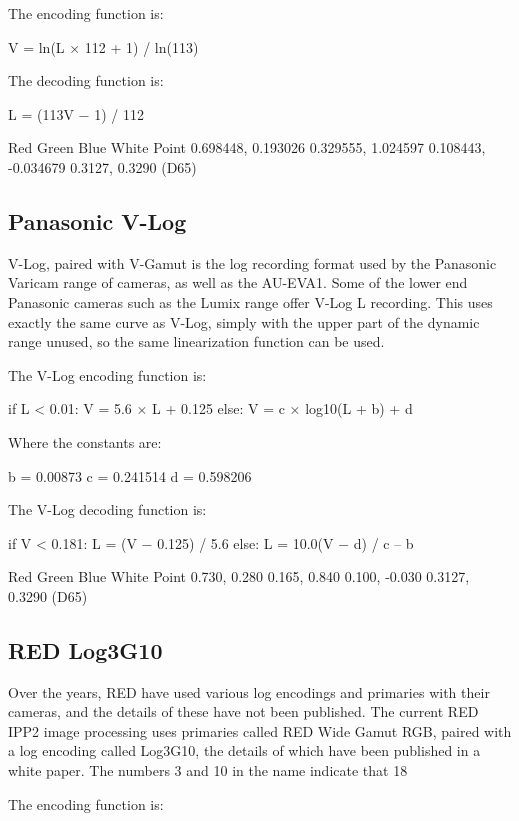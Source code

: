 The encoding function is:

	V = ln(L × 112 + 1) / ln(113)



The decoding function is:

	L = (113V − 1) / 112


Red
Green
Blue
White Point
0.698448, 0.193026
0.329555, 1.024597
0.108443, -0.034679
0.3127, 0.3290 (D65)

\subsection{Panasonic V-Log}%
\label{subsec:panasonic-v-log}

V-Log, paired with V-Gamut is the log recording format used by the Panasonic Varicam range of cameras, as well as the AU-EVA1. Some of the lower end Panasonic cameras such as the Lumix range offer V-Log L recording. This uses exactly the same curve as V-Log, simply with the upper part of the dynamic range unused, so the same linearization function can be used.

The V-Log encoding function is:

	if L < 0.01:
		V = 5.6 × L + 0.125
	else:
		V = c × log10(L + b) + d

Where the constants are:

	b = 0.00873
c = 0.241514
d = 0.598206



The V-Log decoding function is:

	if V < 0.181:
		L = (V − 0.125) / 5.6
	else:
		L = 10.0(V − d) / c – b


Red
Green
Blue
White Point
0.730, 0.280
0.165, 0.840
0.100, -0.030
0.3127, 0.3290 (D65)

\subsection{RED Log3G10}%
\label{subsec:red-log3g10}
Over the years, RED have used various log encodings and primaries with their cameras, and the details of these have not been published. The current RED IPP2 image processing uses primaries called RED Wide Gamut RGB, paired with a log encoding called Log3G10, the details of which have been published in a white paper. The numbers 3 and 10 in the name indicate that 18%

The encoding function is:

